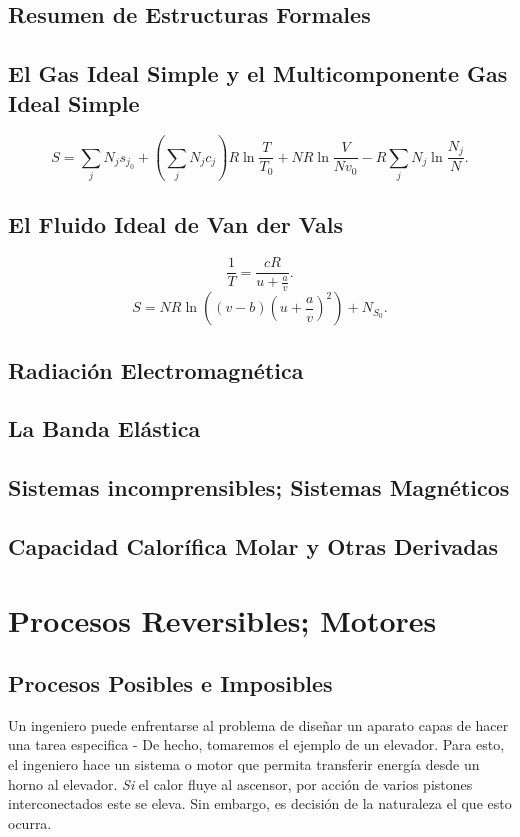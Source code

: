 \documentclass{report}
\begin{document}
\section{Resumen de Estructuras Formales}\label{3.3}
\section{El Gas Ideal Simple y el Multicomponente Gas Ideal Simple}\label{3.4}
\begin{equation}
  \label{eq:3.40}
  S = \sum_j N_js_{j_0} + \left( \sum_j N_jc_j \right)R\ln\frac{T}{T_0}+NR\ln \frac{V}{Nv_0}- R\sum_j N_j\ln \frac{N_j}{N}
.\end{equation}
\section{El Fluido Ideal de Van der Vals}\label{3.5}
\begin{equation}
  \label{eq:3.49}
  \frac{1}{T} = \frac{cR}{u+\frac{a}{v}}
.\end{equation}
\begin{equation}
  \label{eq:3.51}
  S = NR\ln\left( (v-b)\left( u+\frac{a}{v} \right) ^2 \right) + N_{S_0}
.\end{equation}
\section{Radiación Electromagnética}\label{3.6}
\section{La Banda Elástica}\label{3.7}
\section{Sistemas incomprensibles; Sistemas Magnéticos}\label{3.8}
\section{Capacidad Calorífica Molar y Otras Derivadas}\label{3.9}
\chapter{Procesos Reversibles; Motores}
\section{Procesos Posibles e Imposibles} \label{4.1}
Un ingeniero puede enfrentarse al problema de diseñar un aparato capas de hacer una tarea especifica - De hecho, tomaremos el ejemplo de un elevador.
Para esto, el ingeniero hace un sistema o motor que permita transferir energía desde un horno al elevador.
\textit{Si} el calor fluye al ascensor, por acción de varios pistones interconectados este se eleva.
Sin embargo, es decisión de la naturaleza el que esto ocurra.
\end{document}
